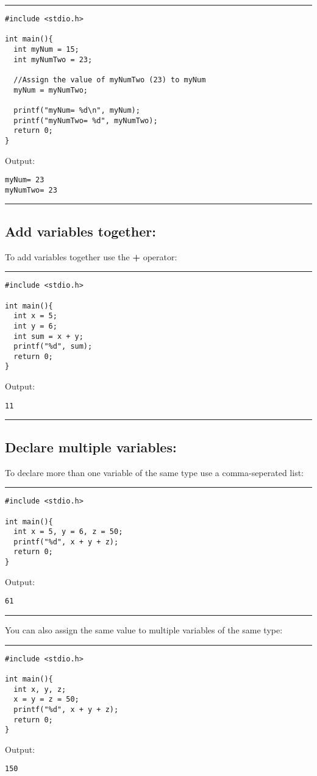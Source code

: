 \documentclass[a4paper]{article}
\begin{document}
\noindent\rule{\textwidth}{0.5pt}
\begin{verbatim}
#include <stdio.h>

int main(){
  int myNum = 15;
  int myNumTwo = 23;

  //Assign the value of myNumTwo (23) to myNum
  myNum = myNumTwo;

  printf("myNum= %d\n", myNum);
  printf("myNumTwo= %d", myNumTwo);
  return 0;
}
\end{verbatim}
Output:
\begin{verbatim}
myNum= 23
myNumTwo= 23
\end{verbatim}

\noindent\rule{\textwidth}{0.5pt}

\subsection{Add variables together:}
\label{sec:orgcb162a9}
To add variables together use the \textbf{+} operator:

\noindent\rule{\textwidth}{0.5pt}
\begin{verbatim}
#include <stdio.h>

int main(){
  int x = 5;
  int y = 6;
  int sum = x + y;
  printf("%d", sum);
  return 0;
}
\end{verbatim}
Output:
\begin{verbatim}
11
\end{verbatim}

\noindent\rule{\textwidth}{0.5pt}

\subsection{Declare multiple variables:}
\label{sec:org5282a61}
To declare more than one variable of the same type use a comma-seperated list:

\noindent\rule{\textwidth}{0.5pt}
\begin{verbatim}
#include <stdio.h>

int main(){
  int x = 5, y = 6, z = 50;
  printf("%d", x + y + z);
  return 0;
}
\end{verbatim}
Output:
\begin{verbatim}
61
\end{verbatim}

\noindent\rule{\textwidth}{0.5pt}
You can also assign the same value to multiple variables of the same type:

\noindent\rule{\textwidth}{0.5pt}
\begin{verbatim}
#include <stdio.h>

int main(){
  int x, y, z;
  x = y = z = 50;
  printf("%d", x + y + z);
  return 0;
}
\end{verbatim}
Output:
\begin{verbatim}
150
\end{verbatim}
\end{document}
